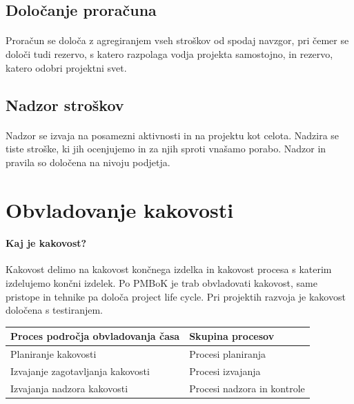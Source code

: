 \documentclass[a4paper,12pt]{report}
\begin{document}
      \subsection{Določanje proračuna}
         \paragraph{} Proračun se določa z agregiranjem vseh stroškov od spodaj navzgor, pri čemer se določi tudi rezervo, s katero razpolaga vodja projekta samostojno, in rezervo, katero odobri projektni svet.
      \subsection{Nadzor stroškov}
         \paragraph{} Nadzor se izvaja na posamezni aktivnosti in na projektu kot celota. Nadzira se tiste stroške, ki jih ocenjujemo in za njih sproti vnašamo porabo. Nadzor in pravila so določena na nivoju podjetja.

   \section{Obvladovanje kakovosti}
      \paragraph{Kaj je kakovost?} Kakovost delimo na kakovost končnega izdelka in kakovost procesa s katerim izdelujemo končni izdelek. Po PMBoK je trab obvladovati kakovost, same pristope in tehnike pa določa project life cycle. Pri projektih razvoja je kakovost določena s testiranjem.
      \begin{center}
         \begin{tabular}{|l|l|}
            \hline
            \textbf{Proces področja obvladovanja časa} & \textbf{Skupina procesov} \\
            \hline
            \hline
            Planiranje kakovosti & Procesi planiranja \\
            \hline
            Izvajanje zagotavljanja kakovosti & Procesi izvajanja \\
            \hline
            Izvajanja nadzora kakovosti & Procesi nadzora in kontrole \\
            \hline
         \end{tabular}
      \end{center}
   
\end{document}
